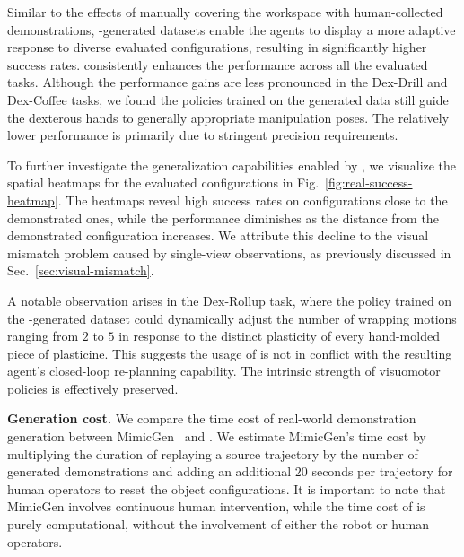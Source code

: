 Similar to the effects of manually covering the workspace with human-collected demonstrations, \method-generated datasets enable the agents to display a more adaptive response to diverse evaluated configurations, resulting in significantly higher success rates. \method consistently enhances the performance across all the evaluated tasks. Although the performance gains are less pronounced in the Dex-Drill and Dex-Coffee tasks, we found the policies trained on the generated data still guide the dexterous hands to generally appropriate manipulation poses. The relatively lower performance is primarily due to stringent precision requirements.


To further investigate the generalization capabilities enabled by \method, we visualize the spatial heatmaps for the evaluated configurations in Fig.~\ref{fig:real-success-heatmap}. The heatmaps reveal high success rates on configurations close to the demonstrated ones, while the performance diminishes as the distance from the demonstrated configuration increases. We attribute this decline to the visual mismatch problem caused by single-view observations, as previously discussed in Sec.~\ref{sec:visual-mismatch}.

A notable observation arises in the Dex-Rollup task, where the policy trained on the \method-generated dataset could dynamically adjust the number of wrapping motions ranging from $2$ to $5$ in response to the distinct plasticity of every hand-molded piece of plasticine. This suggests the usage of \method is not in conflict with the resulting agent's closed-loop re-planning capability. The intrinsic strength of visuomotor policies is effectively preserved.





\vspace{0.2cm} \noindent\textbf{Generation cost.}
We compare the time cost of real-world demonstration generation between MimicGen~\cite{mandlekar2023mimicgen} and \method. We estimate MimicGen's time cost by multiplying the duration of replaying a source trajectory by the number of generated demonstrations and adding an additional $20$ seconds per trajectory for human operators to reset the object configurations. It is important to note that MimicGen involves continuous human intervention, while the time cost of \method is purely computational, without the involvement of either the robot or human operators.





